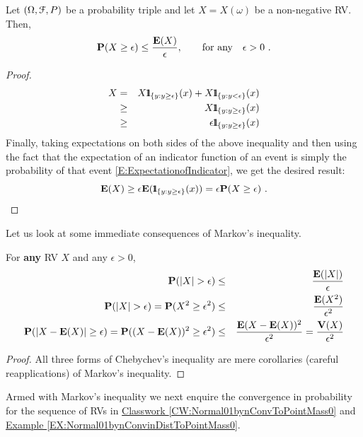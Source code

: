 \begin{prop}
Let $(\Omega,\mathcal{F},P)$ be a probability triple and let $X=X(\omega)$ be a non-negative RV.  Then,
\begin{equation}\label{E:MarkovNeq}
\mathbf{P}(X \geq \epsilon) \leq \frac{\mathbf{E}(X)}{\epsilon}, \qquad \text{for any} \quad \epsilon > 0 \ .
\end{equation}
{\scriptsize
\begin{proof}
\begin{eqnarray}
X &=& X \BB{1}_{ \{y: y \geq \epsilon \} } (x) + X \BB{1}_{ \{y: y < \epsilon \} } (x) \notag \\
&\geq& X \BB{1}_{ \{y: y \geq \epsilon \} } (x) \notag \\
&\geq& \epsilon  \BB{1}_{ \{y: y \geq \epsilon \} } (x) \notag \\
\end{eqnarray}
Finally, taking expectations on both sides of the above inequality and then using the fact that the expectation of an indicator function of an event is simply the probability of that event \eqref{E:ExpectationofIndicator}, we get the desired result:
\[
\mathbf{E}(X) \geq \epsilon \mathbf{E}( {1}\mspace{-11 mu}{1}_{ \{y: y \geq \epsilon \} } (x)) = \epsilon \mathbf{P}(X \geq \epsilon) \ .
\]
\end{proof}
}
\end{prop}
Let us look at some immediate consequences of Markov's inequality.
\begin{prop}
For {\bf any} RV $X$ and any $\epsilon > 0$,
\begin{eqnarray}
\mathbf{P}(|X| > \epsilon) &\leq& \frac{\mathbf{E}(|X|)}{\epsilon} \label{E:ChebychevNeq1} \\
\mathbf{P}(|X| > \epsilon) = \mathbf{P}(X^2 \geq \epsilon^2) &\leq& \frac{\mathbf{E}(X^2)}{\epsilon^2} \label{E:ChebychevNeq2} \\
\mathbf{P}(|X-\mathbf{E}(X)| \geq \epsilon) = \mathbf{P}((X-\mathbf{E}(X))^2 \geq \epsilon^2) &\leq& \frac{\mathbf{E}(X-\mathbf{E}(X))^2}{\epsilon^2}  = \frac{\mathbf{V}(X)}{\epsilon^2}  \label{E:ChebychevNeq3} 
\end{eqnarray}
{\scriptsize
\begin{proof}
All three forms of Chebychev's inequality are mere corollaries (careful reapplications) of Markov's inequality.
\end{proof}
}
\end{prop}

Armed with Markov's inequality we next enquire the convergence in probability for the sequence of RVs in \hyperref[CW:Normal01bynConvToPointMass0]{Classwork \ref*{CW:Normal01bynConvToPointMass0}} and \hyperref[EX:Normal01bynConvinDistToPointMass0]{Example \ref*{EX:Normal01bynConvinDistToPointMass0}}.

